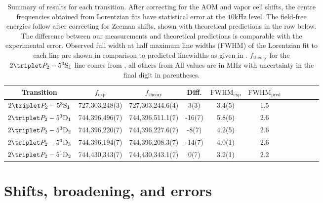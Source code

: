 \begin{table}
    \begin{tabular}{c c c c c c c c c c c}
      \hline\hline
      Transition                        &  $f_\textrm{exp}$ &  $f_\textrm{theory}$ & Diff.
		  &  $\textrm{FWHM}_{\textrm{exp}}$  &  $\textrm{FWHM}_{{\textrm{pred}}}$ \\
      \hline
        $2\triplet P_2 - 5^3\mathrm{S}_1$ &  {727,303,248(3)} &   727,303,244.6(4)   &  {3(3)}      &  3.4(5)  &  1.5\\ %
        $2\triplet P_2 - 5^3\mathrm{D}_1$ &  {744,396,496(7)} &   744,396,511.1(7)   &  {-16(7)}     &  5.8(6)  &  2.6\\
        $2\triplet P_2 - 5^3\mathrm{D}_2$ &  {744,396,220(7)} &   744,396,227.6(7)   &  {-8(7)}      &  4.2(5)  &  2.6\\
        $2\triplet P_2 - 5^3\mathrm{D}_3$ &  {744,396,194(7)} &   744,396,208.3(7)   &  {-14(7)}     &  4.0(1)  &  2.6\\
        $2\triplet P_2 - 5^1\mathrm{D}_2$ &  {744,430,343(7)} &   744,430,343.1(7)   &  {0(7)}      &  3.2(1)  &  2.2\\  %
      \hline\hline
    \end{tabular}
\caption{Summary of results for each transition.
	After correcting for the AOM and vapor cell shifts, the centre frequencies obtained from Lorentzian fits have statistical error at the $10\textrm{kHz}$ level.
	The field-free energies follow after correcting for Zeeman shifts, shown with theoretical predictions in the row below.
	The difference between our measurements and theoretical predictions is comparable with the experimental error.
	Observed full width at half maximum line widths (FWHM) of the Lorentzian fit to each line are shown in comparison to predicted linewidths as given in \cite{Drake07}.
	$f_\textrm{theory}$ for the $2\triplet P_2 - 5^3\mathrm{S}_1$ line comes from \cite{Drake07}, all others from \cite{Yerokhin20}
	All values are in MHz with uncertainty in the final digit in parentheses.}
  \label{tab:results}
\end{table}

\section{Shifts, broadening, and errors}





